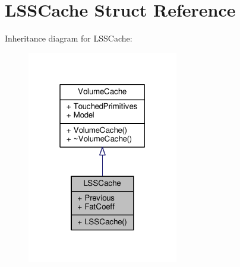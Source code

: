 \hypertarget{structLSSCache}{}\section{L\+S\+S\+Cache Struct Reference}
\label{structLSSCache}


Inheritance diagram for L\+S\+S\+Cache\+:
\nopagebreak
\begin{figure}[H]
\begin{center}
\leavevmode
\includegraphics[width=187pt]{d8/d81/structLSSCache__inherit__graph}
\end{center}
\end{figure}


